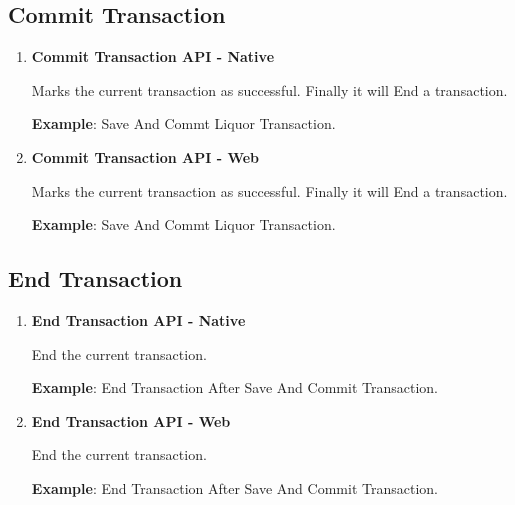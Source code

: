 	\subsection{Commit Transaction}
	
		\begin{enumerate}
	
			\item \small \textbf{Commit Transaction API - Native}
				

				\par
				Marks the current transaction as successful. Finally it will End a transaction.

				\par
					\textbf{Example}: Save And Commt Liquor Transaction.
						


			\item \small \textbf{Commit Transaction API - Web}
				

				\par
				Marks the current transaction as successful. Finally it will End a transaction.

				\par
					\textbf{Example}: Save And Commt Liquor Transaction.
						

		\end{enumerate}



	
	\subsection{End Transaction}

		\begin{enumerate}

			\item \small \textbf{End Transaction API - Native}
				

				\par
					End the current transaction.

				\par
					\textbf{Example}: End Transaction After Save And Commit Transaction.
						


			\item \small \textbf{End Transaction API - Web}
				

				\par
					End the current transaction.

				\par
					\textbf{Example}: End Transaction After Save And Commit Transaction.
						

		\end{enumerate}


